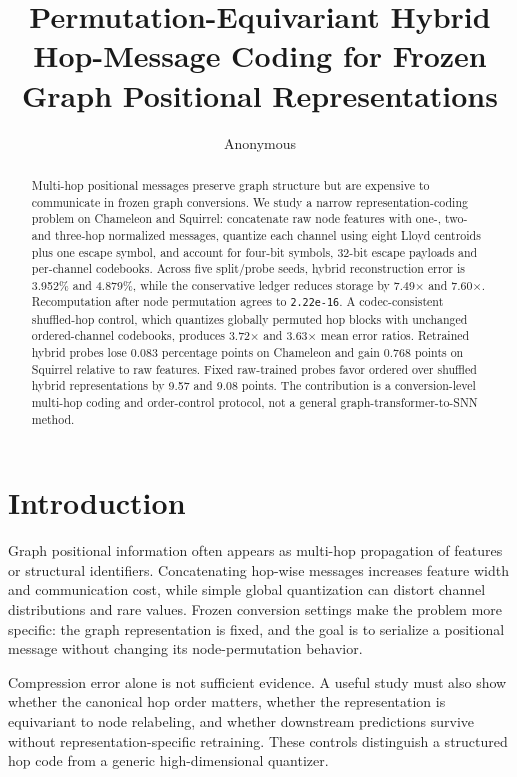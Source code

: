 \documentclass{article}
\title{Permutation-Equivariant Hybrid Hop-Message Coding for Frozen Graph Positional Representations}
\author{Anonymous}
\begin{document}
\begin{abstract}
Multi-hop positional messages preserve graph structure but are expensive to communicate in frozen graph conversions. We study a narrow representation-coding problem on Chameleon and Squirrel: concatenate raw node features with one-, two- and three-hop normalized messages, quantize each channel using eight Lloyd centroids plus one escape symbol, and account for four-bit symbols, 32-bit escape payloads and per-channel codebooks. Across five split/probe seeds, hybrid reconstruction error is 3.952\% and 4.879\%, while the conservative ledger reduces storage by 7.49$\times$ and 7.60$\times$. Recomputation after node permutation agrees to \texttt{2.22e-16}. A codec-consistent shuffled-hop control, which quantizes globally permuted hop blocks with unchanged ordered-channel codebooks, produces 3.72$\times$ and 3.63$\times$ mean error ratios. Retrained hybrid probes lose 0.083 percentage points on Chameleon and gain 0.768 points on Squirrel relative to raw features. Fixed raw-trained probes favor ordered over shuffled hybrid representations by 9.57 and 9.08 points. The contribution is a conversion-level multi-hop coding and order-control protocol, not a general graph-transformer-to-SNN method.
\end{abstract}

\maketitle

\section{Introduction}

\label{sec:introduction}

Graph positional information often appears as multi-hop propagation of features or structural identifiers. Concatenating hop-wise messages increases feature width and communication cost, while simple global quantization can distort channel distributions and rare values. Frozen conversion settings make the problem more specific: the graph representation is fixed, and the goal is to serialize a positional message without changing its node-permutation behavior.

Compression error alone is not sufficient evidence. A useful study must also show whether the canonical hop order matters, whether the representation is equivariant to node relabeling, and whether downstream predictions survive without representation-specific retraining. These controls distinguish a structured hop code from a generic high-dimensional quantizer.
\end{document}

